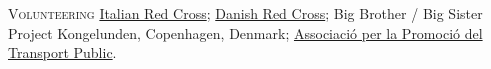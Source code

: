 \begin{paracol}{2}
  \textsc{Volunteering}
\switchcolumn
  \href{https://www.cri.it}{Italian Red Cross};
  \href{https://www.rodekors.dk/}{Danish Red Cross};
  Big Brother / Big Sister Project Kongelunden, Copenhagen, Denmark;
  \href{https://transportpublic.org/}{Associació per la Promoció del Transport Public}.
\end{paracol}